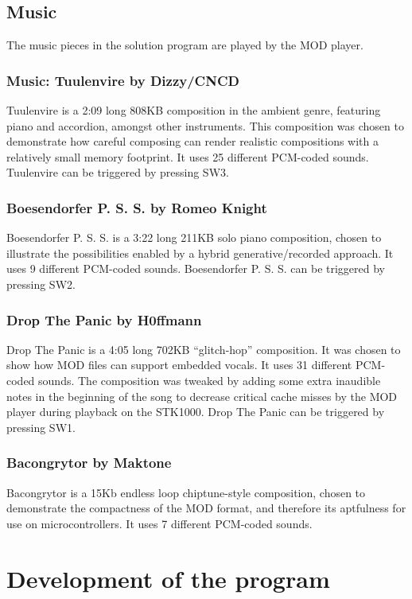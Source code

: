 \subsection{Music}

The music pieces in the solution program are played by the MOD player.

\subsubsection{Music: Tuulenvire by Dizzy/CNCD}
Tuulenvire is a 2:09 long 808KB composition in the ambient genre, featuring piano and accordion, amongst other instruments.
This composition was chosen to demonstrate how careful composing can render realistic compositions with a relatively small memory footprint.
It uses 25 different PCM-coded sounds.
Tuulenvire can be triggered by pressing SW3.

\subsubsection{Boesendorfer P. S. S. by Romeo Knight}
Boesendorfer P. S. S. is a 3:22 long 211KB solo piano composition, chosen to illustrate the possibilities enabled by a hybrid generative/recorded approach.
It uses 9 different PCM-coded sounds.
Boesendorfer P. S. S. can be triggered by pressing SW2.

\subsubsection{Drop The Panic by H0ffmann}
Drop The Panic is a 4:05 long 702KB ``glitch-hop'' composition.
It was chosen to show how MOD files can support embedded vocals.
It uses 31 different PCM-coded sounds.
The composition was tweaked by adding some extra inaudible notes in the beginning of the song to decrease critical cache misses by the MOD player during playback on the STK1000.
Drop The Panic can be triggered by pressing SW1.

\subsubsection{Bacongrytor by Maktone}
Bacongrytor is a 15Kb endless loop chiptune-style composition, chosen to demonstrate the compactness of the MOD format, and therefore its aptfulness for use on microcontrollers.
It uses 7 different PCM-coded sounds.


\section{Development of the program}

